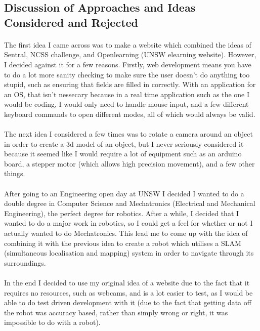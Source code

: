 \subsection{Discussion of Approaches and Ideas Considered and Rejected}
\paragraph{}
The first idea I came across was to make a website which combined the ideas of Sentral, NCSS challenge, and Openlearning (UNSW elearning website). However, I decided against it for a few reasons. Firstly, web development means you have to do a lot more sanity checking to make sure the user doesn't do anything too stupid, such as ensuring that fields are filled in correctly. With an application for an OS, that isn't nessecary because in a real time application such as the one I would be coding, I would only need to handle mouse input, and a few different keyboard commands to open different modes, all of which would always be valid.

\paragraph{}
The next idea I considered a few times was to rotate a camera around an object in order to create a 3d model of an object, but I never seriously considered it because it seemed like I would require a lot of equipment such as an arduino board, a stepper motor (which allows high precision movement), and a few other things.

\paragraph{}
After going to an Engineering open day at UNSW I decided I wanted to do a double degree in Computer Science and Mechatronics (Electrical and Mechanical Engineering), the perfect degree for robotics. After a while, I decided that I wanted to do a major work in robotics, so I could get a feel for whether or not I actually wanted to do Mechatronics. This lead me to come up with the idea of combining it with the previous idea to create a robot which utilises a SLAM (simultaneous localisation and mapping) system in order to navigate through its surroundings.

\paragraph{}
In the end I decided to use my original idea of a website due to the fact that it requires no resources, such as webcams, and is a lot easier to test, as I would be able to do test driven development with it (due to the fact that getting data off the robot was accuracy based, rather than simply wrong or right, it was impossible to do with a robot).